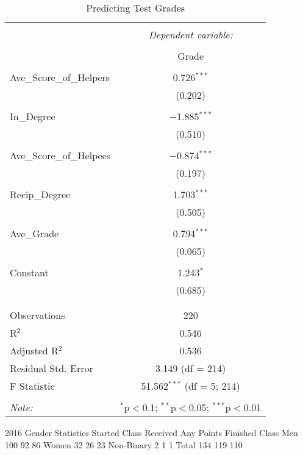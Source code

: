 \documentclass[a4paper]{article}
\begin{document}
\begin{table}[!htbp] \centering 
  \caption{Predicting Test Grades} 
  \label{} 
\begin{tabular}{@{\extracolsep{5pt}}lc} 
\\[-1.8ex]\hline 
\hline \\[-1.8ex] 
 & \multicolumn{1}{c}{\textit{Dependent variable:}} \\ 
\cline{2-2} 
\\[-1.8ex] & Grade \\ 
\hline \\[-1.8ex] 
 Ave\_Score\_of\_Helpers & 0.726$^{***}$ \\ 
  & (0.202) \\ 
  & \\ 
 In\_Degree & $-$1.885$^{***}$ \\ 
  & (0.510) \\ 
  & \\ 
 Ave\_Score\_of\_Helpees & $-$0.874$^{***}$ \\ 
  & (0.197) \\ 
  & \\ 
 Recip\_Degree & 1.703$^{***}$ \\ 
  & (0.505) \\ 
  & \\ 
 Ave\_Grade & 0.794$^{***}$ \\ 
  & (0.065) \\ 
  & \\ 
 Constant & 1.243$^{*}$ \\ 
  & (0.685) \\ 
  & \\ 
\hline \\[-1.8ex] 
Observations & 220 \\ 
R$^{2}$ & 0.546 \\ 
Adjusted R$^{2}$ & 0.536 \\ 
Residual Std. Error & 3.149 (df = 214) \\ 
F Statistic & 51.562$^{***}$ (df = 5; 214) \\ 
\hline 
\hline \\[-1.8ex] 
\textit{Note:}  & \multicolumn{1}{r}{$^{*}$p$<$0.1; $^{**}$p$<$0.05; $^{***}$p$<$0.01} \\ 
\end{tabular} 
\end{table} 


2016 Gender Statistics
Started Class
Received Any Points
Finished Class
Men
100
92
86
Women
32
26
23
Non-Binary
2
1
1
Total
134
119
110
\end{document}

